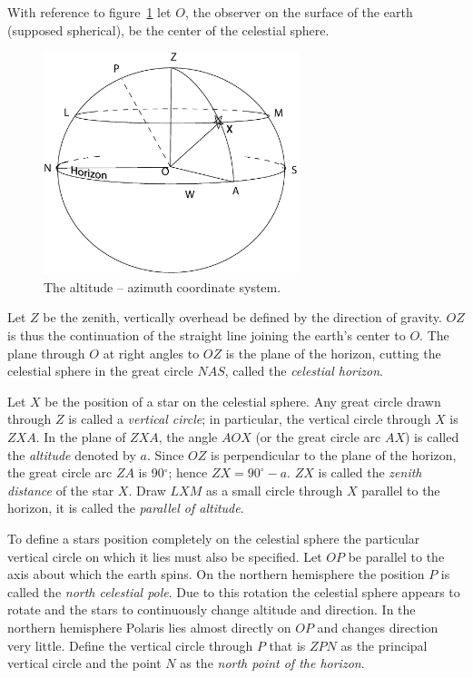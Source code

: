 With reference to figure~\ref{fig:alt-az} let $O$, the observer on
the surface of the earth (supposed spherical), be the center of the
celestial sphere. 

\begin{figure}[h]
\centering
\includegraphics[width=0.66\textwidth]{alt-az.eps}
\caption{The altitude -- azimuth coordinate system.}
\label{fig:alt-az}
\end{figure}

Let $Z$ be the zenith, vertically overhead be defined by the direction
of gravity. $OZ$ is thus the continuation of the straight line joining
the earth's center to $O$. The plane through $O$ at right angles to
$OZ$ is the plane of the horizon, cutting the celestial sphere in the
great circle $NAS$, called the {\it celestial horizon}. 

Let $X$ be the position of a star on the celestial sphere. Any great
circle drawn through $Z$ is called a {\it vertical circle}; in
particular, the vertical circle through $X$ is $ZXA$. In the plane of
$ZXA$, the angle $AOX$ (or the great circle arc $AX$) is called the
{\it altitude} denoted by $a$. Since $OZ$ is perpendicular to the plane of
the horizon, the great circle arc $ZA$ is 90$^\circ$; hence
$ZX=90^\circ-a$. $ZX$ is called the {\it zenith distance} of the star
$X$. Draw $LXM$ as a small circle through $X$ parallel to the
horizon, it is called the {\it parallel of altitude}. 

To define a stars position completely on the celestial sphere the
particular vertical circle on which it lies must also be
specified. Let $OP$ be parallel to the axis about which the earth
spins. On the northern hemisphere the position $P$ is called the {\it
  north celestial pole}. Due to this rotation the celestial sphere
appears to rotate and the stars to continuously change altitude and
direction. In the northern hemisphere Polaris lies almost directly on
$OP$ and changes direction very little. Define the vertical circle
through $P$ that is $ZPN$ as the principal vertical circle and the
point $N$ as the {\it north point of the horizon}. 

